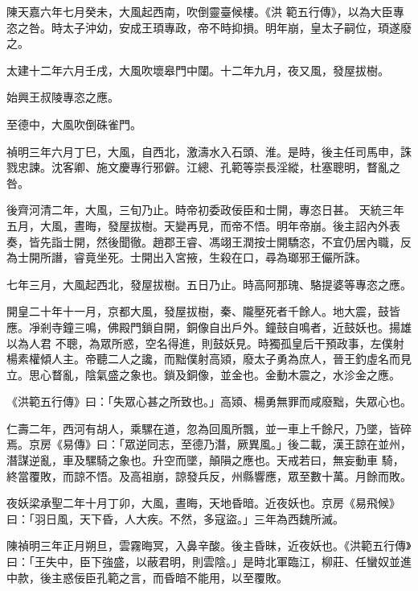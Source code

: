 \begin{pinyinscope}
 陳天嘉六年七月癸未，大風起西南，吹倒靈臺候樓。《洪
 範五行傳》，以為大臣專恣之咎。時太子沖幼，安成王頊專政，帝不時抑損。明年崩，皇太子嗣位，頊遂廢之。



 太建十二年六月壬戌，大風吹壞皋門中闥。十二年九月，夜又風，發屋拔樹。



 始興王叔陵專恣之應。



 至德中，大風吹倒硃雀門。



 禎明三年六月丁巳，大風，自西北，激濤水入石頭、淮。是時，後主任司馬申，誅戮忠諫。沈客卿、施文慶專行邪僻。江總、孔範等崇長淫縱，杜塞聰明，瞀亂之咎。



 後齊河清二年，大風，三旬乃止。時帝初委政佞臣和士開，專恣日甚。
 天統三年五月，大風，晝晦，發屋拔樹。天變再見，而帝不悟。明年帝崩。後主詔內外表奏，皆先詣士開，然後聞徹。趙郡王睿、馮翊王潤按士開驕恣，不宜仍居內職，反為士開所譖，睿竟坐死。士開出入宮掖，生殺在口，尋為瑯邪王儼所誅。



 七年三月，大風起西北，發屋拔樹。五日乃止。時高阿那瑰、駱提婆等專恣之應。



 開皇二十年十一月，京都大風，發屋拔樹，秦、隴壓死者千餘人。地大震，鼓皆應。凈剎寺鐘三鳴，佛殿門鎖自開，銅像自出戶外。鐘鼓自鳴者，近鼓妖也。揚雄以為人君
 不聰，為眾所惑，空名得進，則鼓妖見。時獨孤皇后干預政事，左僕射楊素權傾人主。帝聽二人之讒，而黜僕射高熲，廢太子勇為庶人，晉王釣虛名而見立。思心瞀亂，陰氣盛之象也。鎖及銅像，並金也。金動木震之，水沴金之應。



 《洪範五行傳》曰：「失眾心甚之所致也。」高熲、楊勇無罪而咸廢黜，失眾心也。



 仁壽二年，西河有胡人，乘騾在道，忽為回風所飄，並一車上千餘尺，乃墜，皆碎焉。京房《易傳》曰：「眾逆同志，至德乃潛，厥異風。」後二載，漢王諒在並州，潛謀逆亂，車及騾騎之象也。升空而墜，顛隕之應也。天戒若曰，無妄動車
 騎，終當覆敗，而諒不悟。及高祖崩，諒發兵反，州縣響應，眾至數十萬。月餘而敗。



 夜妖梁承聖二年十月丁卯，大風，晝晦，天地昏暗。近夜妖也。京房《易飛候》曰：「羽日風，天下昏，人大疾。不然，多寇盜。」三年為西魏所滅。



 陳禎明三年正月朔旦，雲霧晦冥，入鼻辛酸。後主昏昧，近夜妖也。《洪範五行傳》曰：「王失中，臣下強盛，以蔽君明，則雲陰。」是時北軍臨江，柳莊、任蠻奴並進中款，後主惑佞臣孔範之言，而昏暗不能用，以至覆敗。




\end{pinyinscope}
